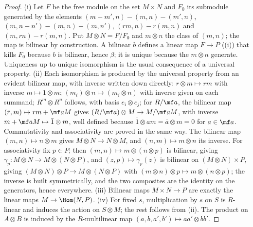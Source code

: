\begin{proof}
(i) Let $F$ be the free module on the set $M\times N$ and $F_0$ its submodule generated by the elements
$(m+m',n)-(m,n)-(m',n)$, $(m,n+n')-(m,n)-(m,n')$, $(rm,n)-r(m,n)$ and $(m,rn)-r(m,n)$. Put $M\otimes N=F/F_0$ and $m\otimes n$ the
class of $(m,n)$; the map is bilinear by construction. A bilinear $b$ defines a linear map $F\to P$ ((i))
that kills $F_0$ because $b$ is bilinear, hence $\beta$; it is unique because the $m\otimes n$ generate. Uniqueness up to unique
isomorphism is the usual consequence of a universal property.
(ii) Each isomorphism is produced by the universal property from an evident bilinear map, with inverse written down
directly: $r\otimes m\mapsto rm$ with inverse $m\mapsto1\otimes m$; $(m_i)\otimes n\mapsto(m_i\otimes n)$ with inverse given on each summand;
$R^m\otimes R^n$ follows, with basis $e_i\otimes e_j$; for $R/\mf a$, the bilinear map $(\bar r,m)\mapsto rm+\mf aM$ gives
$(R/\mf a)\otimes M\to M/\mf aM$, with inverse $m+\mf aM\mapsto\bar1\otimes m$, well defined because $\bar1\otimes am=\bar a\otimes m=0$ for $a\in\mf a$.
Commutativity and associativity are proved in the same way. The bilinear map $(m,n)\mapsto n\otimes m$ gives $M\otimes N\to N\otimes M$,
and $(n,m)\mapsto m\otimes n$ its inverse. For associativity fix $p\in P$; then $(m,n)\mapsto m\otimes(n\otimes p)$ is bilinear, giving
$\gamma_p\colon M\otimes N\to M\otimes(N\otimes P)$, and $(z,p)\mapsto\gamma_p(z)$ is bilinear on $(M\otimes N)\times P$, giving
$(M\otimes N)\otimes P\to M\otimes(N\otimes P)$ with $(m\otimes n)\otimes p\mapsto m\otimes(n\otimes p)$; the inverse is built symmetrically, and the two
composites are the identity on the generators, hence everywhere.
(iii) Bilinear maps $M\times N\to P$ are exactly the linear maps $M\to\Hom(N,P)$.
(iv) For fixed $s$, multiplication by $s$ on $S$ is $R$-linear and induces the action on $S\otimes M$; the rest follows from (ii).
The product on $A\otimes B$ is induced by the $R$-multilinear map $(a,b,a',b')\mapsto aa'\otimes bb'$.
\end{proof}

